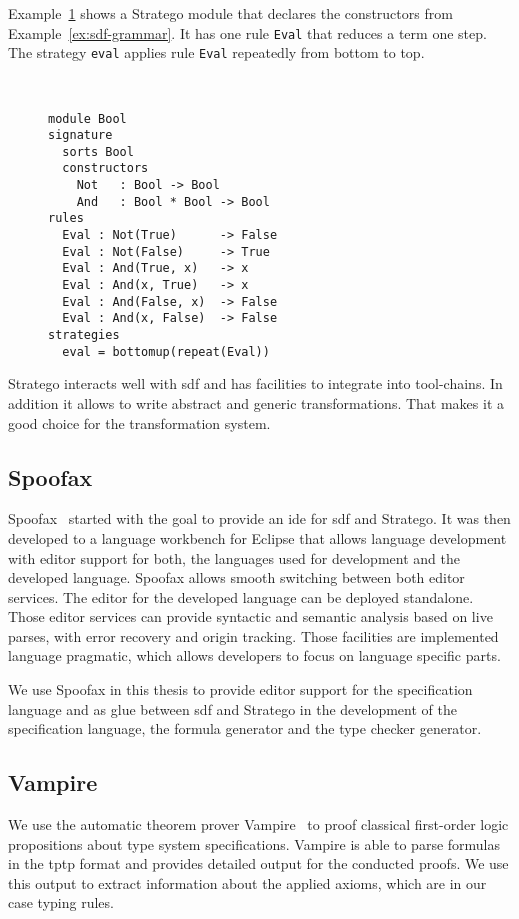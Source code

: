 Example~\ref{ex:stratego-module} shows a Stratego module that declares
the constructors from Example~\ref{ex:sdf-grammar}. It has one rule
\verb|Eval| that reduces a term one step. The strategy \verb|eval|
applies rule \verb|Eval| repeatedly from bottom to top.

\begin{figure}
\begin{example}{~}
\begin{lstlisting}[language=stratego]
module Bool
signature
  sorts Bool
  constructors
    Not   : Bool -> Bool 
    And   : Bool * Bool -> Bool
rules
  Eval : Not(True)      -> False
  Eval : Not(False)     -> True
  Eval : And(True, x)   -> x
  Eval : And(x, True)   -> x
  Eval : And(False, x)  -> False
  Eval : And(x, False)  -> False
strategies
  eval = bottomup(repeat(Eval))
\end{lstlisting}
\label{ex:stratego-module}
\end{example}
\end{figure}

Stratego interacts well with \gls{sdf} and has facilities to integrate
into tool-chains. In addition it allows to write abstract and generic
transformations. That makes it a good choice for the transformation
system.

\subsection{Spoofax}
Spoofax~\cite{KatsV10} started with the goal to provide an \gls{ide}
for \gls{sdf} and Stratego. It was then developed to a language
workbench for Eclipse that allows language development with editor
support for both, the languages used for development and the developed
language. Spoofax allows smooth switching between both editor
services. The editor for the developed language can be deployed
standalone. Those editor services can provide syntactic and semantic
analysis based on live parses, with error recovery and origin
tracking. Those facilities are implemented language pragmatic, which
allows developers to focus on language specific parts.

We use Spoofax in this thesis to provide editor support for the
specification language and as glue between \gls{sdf} and Stratego in
the development of the specification language, the formula generator
and the type checker generator.

\subsection{Vampire}
We use the automatic theorem prover Vampire~\cite{VoronkovVampire} to
proof classical first-order logic propositions about type system
specifications. Vampire is able to parse formulas in the \gls{tptp}
format and provides detailed output for the conducted proofs. We use
this output to extract information about the applied axioms, which are
in our case typing rules.

